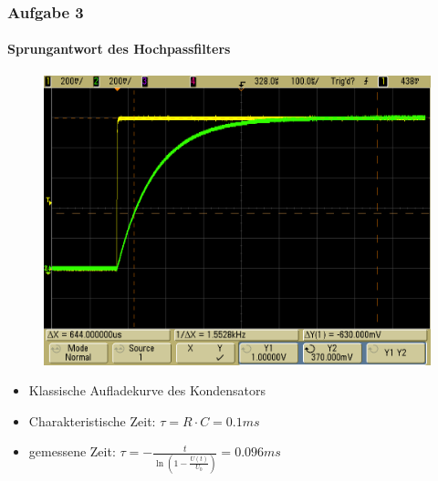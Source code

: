 \begin{frame}
    \frametitle{Aufgabe 3}
    \framesubtitle{Sprungantwort des Hochpassfilters}
     \begin{figure}[H]
     \begin{center}
             \includegraphics[scale=0.2]{./img/3_3.png}
     \end{center}
     \end{figure}
     \begin{itemize}
         \item Klassische Aufladekurve des Kondensators
         \item Charakteristische Zeit: $\tau = R \cdot C = 0.1 ms$
         \item gemessene Zeit: $\tau = - \frac{t}{\ln \left( 1-
         \frac{U(t)}{U_0}\right)} = 0.096 ms$
     \end{itemize}
\end{frame}
